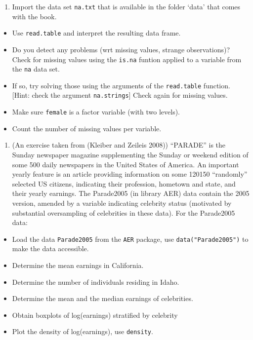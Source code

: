 \documentclass[
]{book}
\providecommand{\tightlist}{%
  \setlength{\itemsep}{0pt}\setlength{\parskip}{0pt}}
\begin{document}
\begin{enumerate}
\def\labelenumi{\arabic{enumi}.}
\tightlist
\item
  Import the data set \texttt{na.txt} that is available in the folder `data' that comes with the book.
\end{enumerate}

\begin{itemize}
\tightlist
\item
  Use \texttt{read.table} and interpret the resulting data frame.
\item
  Do you detect any problems (wrt missing values, strange observations)? Check for missing values using the \texttt{is.na} funtion applied to a variable from the \texttt{na} data set.
\item
  If so, try solving those using the arguments of the \texttt{read.table} function. {[}Hint: check the argument \texttt{na.strings}{]} Check again for missing values.
\item
  Make sure \texttt{female} is a factor variable (with two levels).
\item
  Count the number of missing values per variable.
\end{itemize}

\begin{enumerate}
\def\labelenumi{\arabic{enumi}.}
\setcounter{enumi}{1}
\tightlist
\item
  (An exercise taken from (Kleiber and Zeileis 2008)) ``PARADE'' is the Sunday newspaper magazine supplementing the Sunday or weekend edition of some 500 daily newspapers in the United States of America. An important
  yearly feature is an article providing information on some 120150 ``randomly'' selected
  US citizens, indicating their profession, hometown and state, and their yearly earnings.
  The Parade2005 (in library AER) data contain the 2005 version, amended by a variable
  indicating celebrity status (motivated by substantial oversampling of celebrities in these data).
  For the Parade2005 data:
\end{enumerate}

\begin{itemize}
\tightlist
\item
  Load the data \texttt{Parade2005} from the \texttt{AER} package, use \texttt{data("Parade2005")} to make the data accessible.
\item
  Determine the mean earnings in California.
\item
  Determine the number of individuals residing in Idaho.
\item
  Determine the mean and the median earnings of celebrities.
\item
  Obtain boxplots of log(earnings) stratified by celebrity
\item
  Plot the density of log(earnings), use \texttt{density}.
\end{itemize}
\end{document}
